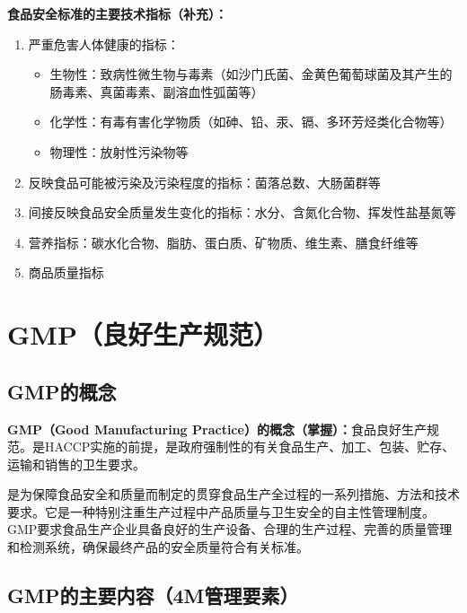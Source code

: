 \begin{defbox}
\textbf{食品安全标准的主要技术指标（补充）：}
\begin{enumerate}[leftmargin=*]
    \item 严重危害人体健康的指标：
    \begin{itemize}[leftmargin=*]
        \item 生物性：致病性微生物与毒素（如沙门氏菌、金黄色葡萄球菌及其产生的肠毒素、真菌毒素、副溶血性弧菌等）
        \item 化学性：有毒有害化学物质（如砷、铅、汞、镉、多环芳烃类化合物等）
        \item 物理性：放射性污染物等
    \end{itemize}
    \item 反映食品可能被污染及污染程度的指标：菌落总数、大肠菌群等
    \item 间接反映食品安全质量发生变化的指标：水分、含氮化合物、挥发性盐基氮等
    \item 营养指标：碳水化合物、脂肪、蛋白质、矿物质、维生素、膳食纤维等
    \item 商品质量指标
\end{enumerate}
\end{defbox}

\section{GMP（良好生产规范）}

\subsection{GMP的概念}

\begin{keybox}
\textbf{GMP（Good Manufacturing Practice）的概念（掌握）：}食品良好生产规范。是HACCP实施的前提，是政府强制性的有关食品生产、加工、包装、贮存、运输和销售的卫生要求。

是为保障食品安全和质量而制定的贯穿食品生产全过程的一系列措施、方法和技术要求。它是一种特别注重生产过程中产品质量与卫生安全的自主性管理制度。GMP要求食品生产企业具备良好的生产设备、合理的生产过程、完善的质量管理和检测系统，确保最终产品的安全质量符合有关标准。
\end{keybox}

\subsection{GMP的主要内容（4M管理要素）}

